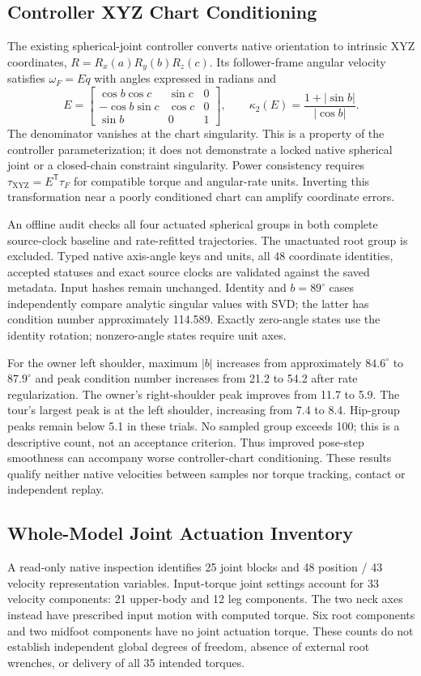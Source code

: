 \documentclass[11pt,a4paper]{article}
\begin{document}
\subsection{Controller XYZ Chart Conditioning}
The existing spherical-joint controller converts native orientation to
intrinsic XYZ coordinates, $R=R_x(a)R_y(b)R_z(c)$. Its follower-frame angular
velocity satisfies $\omega_F=E\dot q$ with angles expressed in radians and
\[
 E=\begin{bmatrix}
 \cos b\cos c&\sin c&0\\
 -\cos b\sin c&\cos c&0\\
 \sin b&0&1
 \end{bmatrix},\qquad
 \kappa_2(E)=\frac{1+|\sin b|}{|\cos b|}.
\]
The denominator vanishes at the chart singularity. This is a property of
the controller parameterization; it does not demonstrate a locked native
spherical joint or a closed-chain constraint singularity. Power consistency
requires $\tau_{\mathrm{XYZ}}=E^{\mathsf T}\tau_F$ for compatible torque
and angular-rate units. Inverting this transformation near a poorly
conditioned chart can amplify coordinate errors.

An offline audit checks all four actuated spherical groups in both complete
source-clock baseline and rate-refitted trajectories. The unactuated root
group is excluded. Typed native axis-angle keys and units, all 48 coordinate
identities, accepted statuses and exact source clocks are validated against
the saved metadata. Input hashes remain unchanged. Identity and
$b=89^\circ$ cases independently compare analytic singular values with SVD;
the latter has condition number approximately 114.589. Exactly zero-angle
states use the identity rotation; nonzero-angle states require unit axes.

For the owner left shoulder, maximum $|b|$ increases from approximately
$84.6^\circ$ to $87.9^\circ$ and peak condition number increases from 21.2
to 54.2 after rate regularization. The owner's right-shoulder peak improves
from 11.7 to 5.9. The tour's largest peak is at the left shoulder, increasing
from 7.4 to 8.4. Hip-group peaks remain below 5.1 in these trials. No sampled
group exceeds 100; this is a descriptive count, not an acceptance criterion.
Thus improved pose-step smoothness can accompany worse controller-chart
conditioning. These results qualify neither native velocities between
samples nor torque tracking, contact or independent replay.

\subsection{Whole-Model Joint Actuation Inventory}
A read-only native inspection identifies 25 joint blocks and 48 position /
43 velocity representation variables. Input-torque joint settings account
for 33 velocity components: 21 upper-body and 12 leg components. The two
neck axes instead have prescribed input motion with computed torque. Six
root components and two midfoot components have no joint actuation torque.
These counts do not establish independent global degrees of freedom,
absence of external root wrenches, or delivery of all 35 intended torques.
\end{document}
